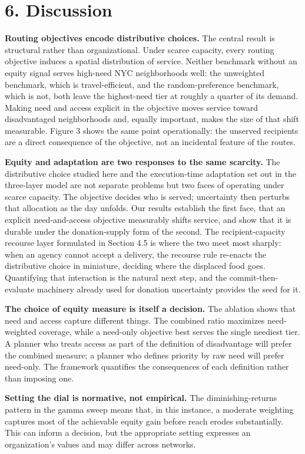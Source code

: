 \documentclass[
  11pt,
]{article}
\begin{document}
\section{6. Discussion}\label{discussion}

\textbf{Routing objectives encode distributive choices.} The central
result is structural rather than organizational. Under scarce capacity,
every routing objective induces a spatial distribution of service.
Neither benchmark without an equity signal serves high-need NYC
neighborhoods well: the unweighted benchmark, which is travel-efficient,
and the random-preference benchmark, which is not, both leave the
highest-need tier at roughly a quarter of its demand. Making need and
access explicit in the objective moves service toward disadvantaged
neighborhoods and, equally important, makes the size of that shift
measurable. Figure 3 shows the same point operationally: the unserved
recipients are a direct consequence of the objective, not an incidental
feature of the routes.

\textbf{Equity and adaptation are two responses to the same scarcity.}
The distributive choice studied here and the execution-time adaptation
set out in the three-layer model are not separate problems but two faces
of operating under scarce capacity. The objective decides who is served;
uncertainty then perturbs that allocation as the day unfolds. Our
results establish the first face, that an explicit need-and-access
objective measurably shifts service, and show that it is durable under
the donation-supply form of the second. The recipient-capacity recourse
layer formulated in Section 4.5 is where the two meet most sharply: when
an agency cannot accept a delivery, the recourse rule re-enacts the
distributive choice in miniature, deciding where the displaced food
goes. Quantifying that interaction is the natural next step, and the
commit-then-evaluate machinery already used for donation uncertainty
provides the seed for it.

\textbf{The choice of equity measure is itself a decision.} The ablation
shows that need and access capture different things. The combined ratio
maximizes need-weighted coverage, while a need-only objective best
serves the single neediest tier. A planner who treats access as part of
the definition of disadvantage will prefer the combined measure; a
planner who defines priority by raw need will prefer need-only. The
framework quantifies the consequences of each definition rather than
imposing one.

\textbf{Setting the dial is normative, not empirical.} The
diminishing-returns pattern in the gamma sweep means that, in this
instance, a moderate weighting captures most of the achievable equity
gain before reach erodes substantially. This can inform a decision, but
the appropriate setting expresses an organization's values and may
differ across networks.
\end{document}
